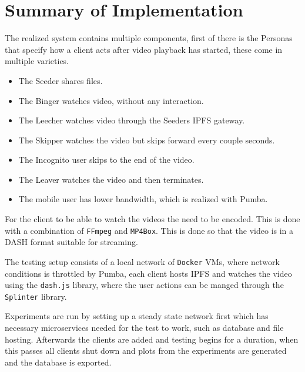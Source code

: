 \section{Summary of Implementation}
The realized system contains multiple components, first of there is the Personas that specify how a client acts after video playback has started, these come in multiple varieties.
\begin{itemize}
    \item The Seeder shares files.
    \item The Binger watches video, without any interaction.
    \item The Leecher watches video through the Seeders \ac{IPFS} gateway.
    \item The Skipper watches the video but skips forward every couple seconds.
    \item The Incognito user skips to the end of the video.
    \item The Leaver watches the video and then terminates.
    \item The mobile user has lower bandwidth, which is realized with Pumba.
\end{itemize}
For the client to be able to watch the videos the need to be encoded. This is done with a combination of \texttt{FFmpeg} and \texttt{MP4Box}. This is done so that the video is in a \ac{DASH} format suitable for streaming.

The testing setup consists of a local network of \texttt{Docker} \acp{VM}, where network conditions is throttled by Pumba, each client hosts \ac{IPFS} and watches the video using the \texttt{dash.js} library, where the user actions can be manged through the \texttt{Splinter} library.

Experiments are run by setting up a steady state network first which has necessary microservices needed for the test to work, such as database and file hosting. Afterwards the clients are added and testing begins for a duration, when this passes all clients shut down and plots from the experiments are generated and the database is exported.

